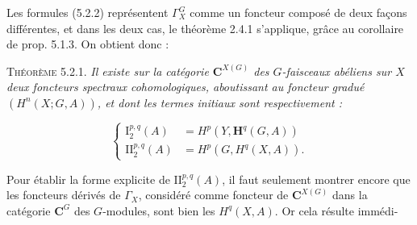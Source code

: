 Les formules (5.2.2) représentent $\Gamma_X^G$ comme un foncteur composé de
deux façons différentes, et dans les deux cas, le théorème 2.4.1 s'applique,
grâce au corollaire de prop. 5.1.3. On obtient donc :

\textsc{Théorème 5.2.1.} \textit{Il existe sur la catégorie
${\mathbf C}^{X(G)}$ des $G$-faisceaux abéliens sur $X$ deux foncteurs spectraux
cohomologiques, aboutissant au foncteur gradué $(H^n(X;G,A))$, et dont les
termes initiaux sont respectivement :}

\[
\tag{5.2.5}
\left\{
\begin{aligned}
\mathrm I_2^{p,q}(A)&=H^p(Y,\mathbf H^q(G,A))\\
\mathrm {II}_2^{p,q}(A)&=H^p(G,H^q(X,A)).
\end{aligned}
\right.
\]

Pour établir la forme explicite de $\mathrm {II}_2^{p,q}(A)$, il faut
seulement montrer encore que les foncteurs dérivés de $\Gamma_X$, considéré
comme foncteur de ${\mathbf C}^{X(G)}$ dans la catégorie ${\mathbf C}^G$ des $G$-modules, sont
bien les $H^q(X,A)$. Or cela résulte immédi-

